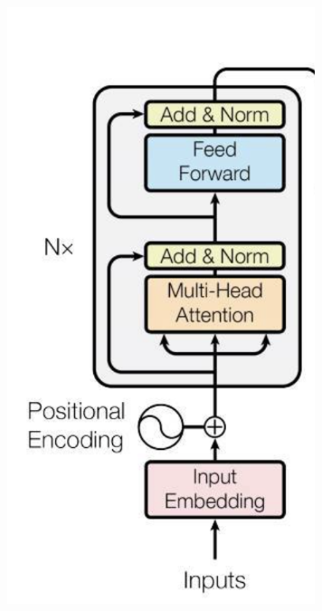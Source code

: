 \documentclass[aspectratio=169]{beamer}
\begin{document}
\begin{frame}
\begin{columns}
\begin{column}{0.2\textwidth}
\begin{figure}
	       		\includegraphics[width=1\textwidth]{assets/trf_enc.png}
	    	\end{figure}
		\end{column}
				\begin{column}{0.8\textwidth}
			\begin{figure}

\end{figure}
\end{column}
\end{columns}
\end{frame}
\end{document}
